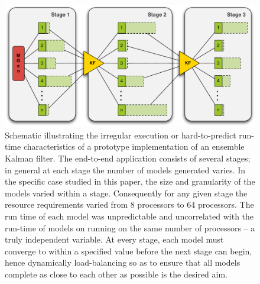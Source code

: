 \documentclass[conference,final]{IEEEtran}
\begin{document}

\begin{figure}
\begin{center}
\includegraphics*[scale=0.36,]{./figures/3StageKalmanFilter}
\end{center}
\caption{Schematic illustrating the irregular execution or
  hard-to-predict run-time characteristics of a prototype
  implementation of an ensemble Kalman filter. The end-to-end
  application consists of several stages; in general at each stage the
  number of models generated varies. In the specific case studied in
  this paper, the size and granularity of the models varied within a
  stage. Consequently for any given stage the resource requirements
  varied from 8 processors to 64 processors.  The run time of each
  model was unpredictable and uncorrelated with the run-time of models
  on running on the same number of processors -- a truly independent
  variable. At every stage, each model must converge to within a
  specified value before the next stage can begin, hence dynamically
  load-balancing so as to ensure that all models complete as close to
  each other as possible is the desired aim.}
\label{fig:irregular_execution}
\end{figure}
\end{document}
